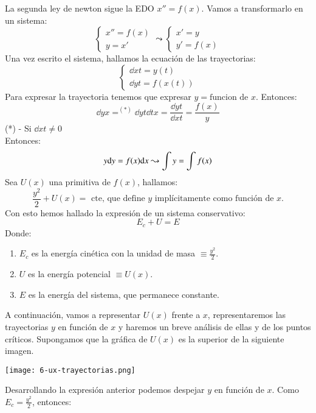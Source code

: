\begin{eg}\label{eg:tray-newt}
    La segunda ley de newton sigue la EDO $x'' = f(x)$. Vamos a transformarlo en un sistema:
    $$
        \begin{cases}
            x'' = f(x)\\
            y = x'
        \end{cases} \leadsto
        \begin{cases}
            x' = y\\
            y' = f(x)
        \end{cases}
    $$
    Una vez escrito el sistema, hallamos la ecuación de las trayectorias:
    $$
        \begin{cases}
            \dd{x}{t} = y(t)\\
            \dd{y}{t} = f(x(t))
        \end{cases}
    $$
    Para expresar la trayectoria tenemos que expresar $y = \text{funcion de } x$. Entonces:
    $$
        \dd{y}{x} =^{(*)} \dd{y}{t} \dd{t}{x} = \frac{\dd{y}{t}}{\dd{x}{t}} = \frac{f(x)}{y}
    $$
    (*) - Si $\dd{x}{t} \neq 0$\\
    Entonces:
    $$
        y\mathrm{d} y = f(x)\mathrm{d} x \leadsto \int y = \int f(x)
    $$
    Sea $U(x)$ una primitiva de $f(x)$, hallamos:
    $$
        \frac{y^2}{2} + U(x) = \text{ cte, que define $y$ implícitamente como función de $x$.}
    $$
    Con esto hemos hallado la expresión de un sistema conservativo:
    $$
        E_c + U = E
    $$
    Donde:
    \begin{enumerate}
        \item $E_c$ es la energía cinética con la unidad de masa $\equiv \frac{y^2}{2}$.
        \item $U$ es la energía potencial $\equiv U(x)$.
        \item $E$ es la energía del sistema, que permanece constante.
    \end{enumerate}
    A continuación, vamos a representar $U(x)$ frente a $x$, representaremos las trayectorias $y$ en función de $x$ y haremos un breve análisis de ellas y de los puntos críticos. Supongamos que la gráfica de $U(x)$ es la superior de la siguiente imagen.
    \begin{center}
        \texttt{[image: 6-ux-trayectorias.png]}
    \end{center}
    Desarrollando la expresión anterior podemos despejar $y$ en función de $x$. Como $E_c = \frac{y^2}{2}$, entonces:
    $$
$$
\end{eg}
